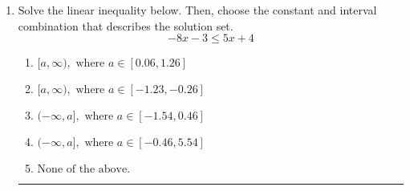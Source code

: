 \documentclass[14pt]{extbook}
\newcommand{\litem}[1]{\item#1\hspace*{-1cm}\rule{\textwidth}{0.4pt}}
\begin{document}
\begin{enumerate}
{\begin{enumerate}[label=\Alph*.]
\end{enumerate} }
\litem{
Solve the linear inequality below. Then, choose the constant and interval combination that describes the solution set.\[ -8x -3 \leq 5x + 4 \]\begin{enumerate}[label=\Alph*.]
\item \( [a, \infty), \text{ where } a \in [0.06, 1.26] \)
\item \( [a, \infty), \text{ where } a \in [-1.23, -0.26] \)
\item \( (-\infty, a], \text{ where } a \in [-1.54, 0.46] \)
\item \( (-\infty, a], \text{ where } a \in [-0.46, 5.54] \)
\item \( \text{None of the above}. \)

\end{enumerate} }
\end{enumerate}
\end{document}
